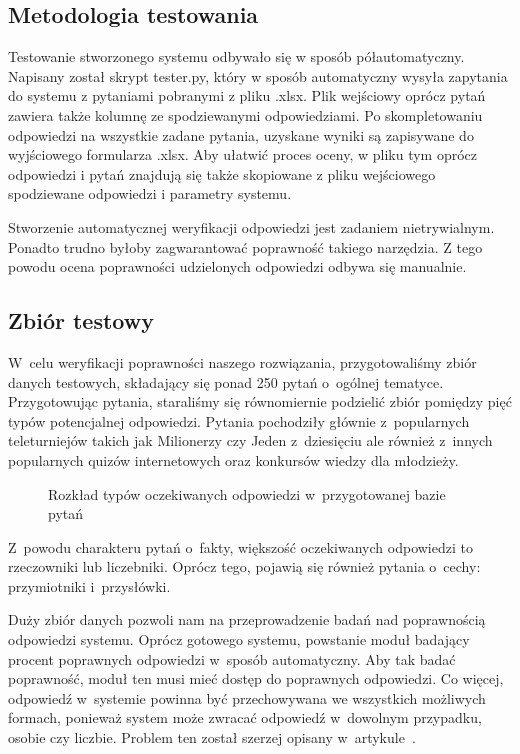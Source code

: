 \subsection{Metodologia testowania}
Testowanie stworzonego systemu odbywało się w sposób półautomatyczny. Napisany został skrypt tester.py, który w sposób automatyczny wysyła zapytania do systemu z pytaniami pobranymi z pliku .xlsx. Plik wejściowy oprócz pytań zawiera także kolumnę ze spodziewanymi odpowiedziami. Po skompletowaniu odpowiedzi na wszystkie zadane pytania,  uzyskane wyniki są zapisywane do wyjściowego formularza .xlsx. Aby ułatwić proces oceny, w pliku tym oprócz odpowiedzi i pytań znajdują się także skopiowane z pliku wejściowego spodziewane odpowiedzi i parametry systemu.

Stworzenie automatycznej weryfikacji odpowiedzi jest zadaniem nietrywialnym. Ponadto trudno byłoby zagwarantować poprawność takiego narzędzia. Z tego powodu ocena poprawności udzielonych odpowiedzi odbywa się manualnie. 

\subsection{Zbiór testowy}
W~celu weryfikacji poprawności naszego rozwiązania, przygotowaliśmy zbiór danych testowych, składający się ponad 250 pytań o~ogólnej tematyce. Przygotowując pytania, staraliśmy się równomiernie podzielić zbiór pomiędzy pięć typów potencjalnej odpowiedzi. Pytania pochodziły głównie z~popularnych teleturniejów takich jak Milionerzy czy Jeden z~dziesięciu ale również z~innych popularnych quizów internetowych oraz konkursów wiedzy dla młodzieży.

\begin{figure}[h!]
    \label{fig:rozklad-typow-odpowiedzi}  
    \caption{Rozkład typów oczekiwanych odpowiedzi w~przygotowanej bazie pytań}
\end{figure}

Z~powodu charakteru pytań o~fakty, większość oczekiwanych odpowiedzi to rzeczowniki lub liczebniki. Oprócz tego, pojawią się również pytania o~cechy: przymiotniki i~przysłówki.

Duży zbiór danych pozwoli nam na przeprowadzenie badań nad poprawnością odpowiedzi systemu. Oprócz gotowego systemu, powstanie moduł badający procent poprawnych odpowiedzi w~sposób automatyczny. Aby tak badać poprawność, moduł ten musi mieć dostęp do poprawnych odpowiedzi. Co więcej, odpowiedź w~systemie powinna być przechowywana we wszystkich możliwych formach, ponieważ system może zwracać odpowiedź w~dowolnym przypadku, osobie czy liczbie. Problem ten został szerzej opisany w~artykule~\cite{brill2002analysis}.


